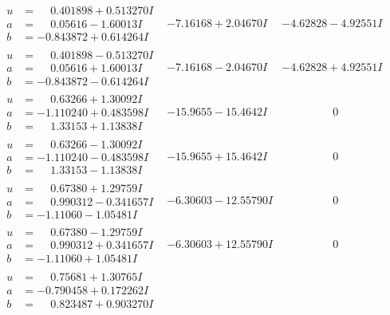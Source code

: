 \documentclass[1p]{elsarticle_modified}
\theoremstyle{definition}
\begin{document}
$$\begin{array}{c|c|c}
\begin{aligned}
u &= \phantom{-}0.401898 + 0.513270 I \\
a &= \phantom{-}0.05616 - 1.60013 I \\
b &= -0.843872 + 0.614264 I\end{aligned}
 & -7.16168 + 2.04670 I & -4.62828 - 4.92551 I \\ \hline\begin{aligned}
u &= \phantom{-}0.401898 - 0.513270 I \\
a &= \phantom{-}0.05616 + 1.60013 I \\
b &= -0.843872 - 0.614264 I\end{aligned}
 & -7.16168 - 2.04670 I & -4.62828 + 4.92551 I \\ \hline\begin{aligned}
u &= \phantom{-}0.63266 + 1.30092 I \\
a &= -1.110240 + 0.483598 I \\
b &= \phantom{-}1.33153 + 1.13838 I\end{aligned}
 & -15.9655 - 15.4642 I & \phantom{-0.000000 } 0 \\ \hline\begin{aligned}
u &= \phantom{-}0.63266 - 1.30092 I \\
a &= -1.110240 - 0.483598 I \\
b &= \phantom{-}1.33153 - 1.13838 I\end{aligned}
 & -15.9655 + 15.4642 I & \phantom{-0.000000 } 0 \\ \hline\begin{aligned}
u &= \phantom{-}0.67380 + 1.29759 I \\
a &= \phantom{-}0.990312 - 0.341657 I \\
b &= -1.11060 - 1.05481 I\end{aligned}
 & -6.30603 - 12.55790 I & \phantom{-0.000000 } 0 \\ \hline\begin{aligned}
u &= \phantom{-}0.67380 - 1.29759 I \\
a &= \phantom{-}0.990312 + 0.341657 I \\
b &= -1.11060 + 1.05481 I\end{aligned}
 & -6.30603 + 12.55790 I & \phantom{-0.000000 } 0 \\ \hline\begin{aligned}
u &= \phantom{-}0.75681 + 1.30765 I \\
a &= -0.790458 + 0.172262 I \\
b &= \phantom{-}0.823487 + 0.903270 I\end{aligned}

\end{array}$$
\end{document}
